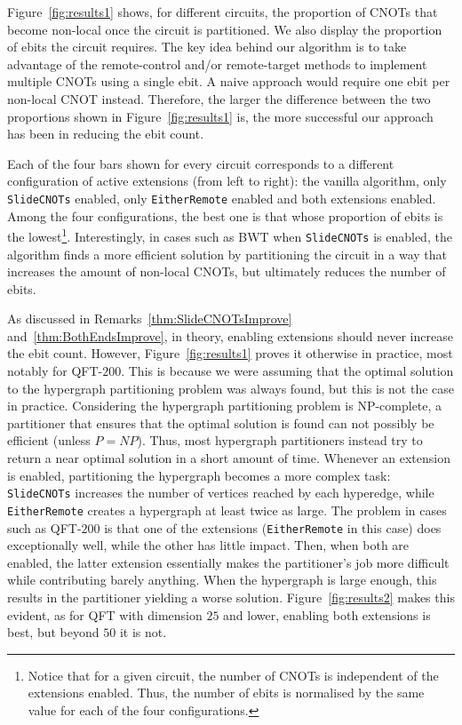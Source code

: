 Figure~\ref{fig:results1} shows, for different circuits, the proportion of CNOTs that become non-local once the circuit is partitioned. We also display the proportion of ebits the circuit requires. The key idea behind our algorithm is to take advantage of the remote-control and/or remote-target methods to implement multiple CNOTs using a single ebit. A naive approach would require one ebit per non-local CNOT instead. Therefore, the larger the difference between the two proportions shown in Figure~\ref{fig:results1} is, the more successful our approach has been in reducing the ebit count. %



Each of the four bars shown for every circuit corresponds to a different configuration of active extensions (from left to right): the vanilla algorithm, only \texttt{SlideCNOTs} enabled, only \texttt{EitherRemote} enabled and both extensions enabled. Among the four configurations, the best one is that whose proportion of ebits is the lowest\footnote{Notice that for a given circuit, the number of CNOTs is independent of the extensions enabled. Thus, the number of ebits is normalised by the same value for each of the four configurations.}. Interestingly, in cases such as BWT when \texttt{SlideCNOTs} is enabled, the algorithm finds a more efficient solution by partitioning the circuit in a way that increases the amount of non-local CNOTs, but ultimately reduces the number of ebits.

As discussed in Remarks~\ref{thm:SlideCNOTsImprove} and~\ref{thm:BothEndsImprove}, in theory, enabling extensions should never increase the ebit count. However, Figure~\ref{fig:results1} proves it otherwise in practice, most notably for QFT-\(200\). This is because we were assuming that the optimal solution to the hypergraph partitioning problem was always found, but this is not the case in practice. Considering the hypergraph partitioning problem is NP-complete, a partitioner that ensures that the optimal solution is found can not possibly be efficient (unless \(P=NP\)). Thus, most hypergraph partitioners instead try to return a near optimal solution in a short amount of time. Whenever an extension is enabled, partitioning the hypergraph becomes a more complex task: \texttt{SlideCNOTs} increases the number of vertices reached by each hyperedge, while \texttt{EitherRemote} creates a hypergraph at least twice as large. The problem in cases such as QFT-\(200\) is that one of the extensions (\texttt{EitherRemote} in this case) does exceptionally well, while the other has little impact. Then, when both are enabled, the latter extension essentially makes the partitioner's job more difficult while contributing barely anything. When the hypergraph is large enough, this results in the partitioner yielding a worse solution. Figure~\ref{fig:results2} makes this evident, as for QFT with dimension \(25\) and lower, enabling both extensions is best, but beyond \(50\) it is not. 

